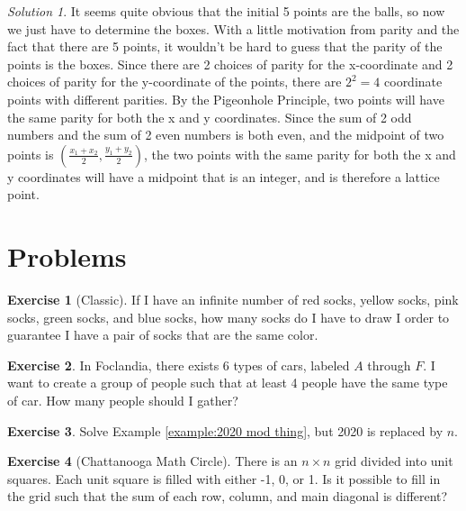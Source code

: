 \documentclass[l1pt]{article}
\theoremstyle{plain}
\theoremstyle{definition}
\newtheorem{exercise}{Exercise}[section]
\theoremstyle{remark}
\newtheorem*{solution}{Solution}
\begin{document}
\begin{solution}
It seems quite obvious that the initial 5 points are the balls, so now we just have to determine the boxes. With a little motivation from parity and the fact that there are 5 points, it wouldn't be hard to guess that the parity of the points is the boxes. Since there are 2 choices of parity for the x-coordinate and 2 choices of parity for the y-coordinate of the points, there are $2^2=4$ coordinate points with different parities. By the Pigeonhole Principle, two points will have the same parity for both the x and y coordinates. Since the sum of 2 odd numbers and the sum of 2 even numbers is both even, and the midpoint of two points is $\left (\frac{x_1+x_2}{2}, \frac{y_1+y_2}{2} \right )$, the two points with the same parity for both the x and y coordinates will have a midpoint that is an integer, and is therefore a lattice point.
\end{solution}




\bigskip


\section{Problems}

\begin{exercise}[Classic]
If I have an infinite number of red socks, yellow socks, pink socks, green socks, and blue socks, how many socks do I have to draw I order to guarantee I have a pair of socks that are the same color.
\end{exercise}

\begin{exercise}
In Foclandia, there exists 6 types of cars, labeled $A$ through $F$. I want to create a group of people such that at least 4 people have the same type of car. How many people should I gather?
\end{exercise}

\begin{exercise}
 Solve Example \ref{example:2020 mod thing}, but 2020 is replaced by $n$.
\end{exercise}

\begin{exercise}[Chattanooga Math Circle]
 There is an $n \times n$ grid divided into unit squares. Each unit square is filled with either -1, 0, or 1. Is it possible to fill in the grid such that the sum of each row, column, and main diagonal is different?
\end{exercise}
\end{document}
